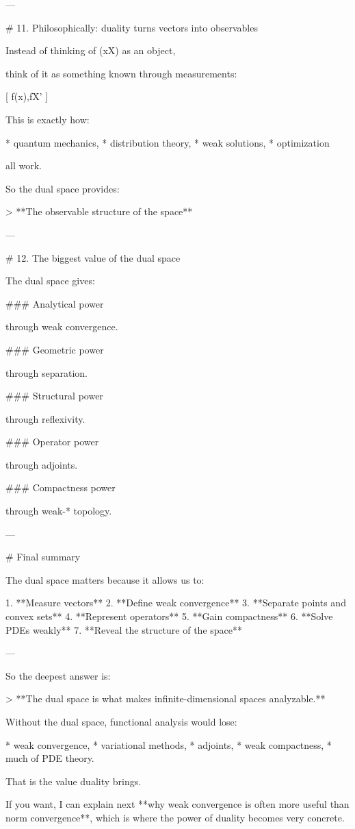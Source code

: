 \begin{description}
---

# 11. Philosophically: duality turns vectors into observables

Instead of thinking of (x\in X) as an object,

think of it as something known through measurements:

[
f(x),\quad f\in X'
]

This is exactly how:

* quantum mechanics,
* distribution theory,
* weak solutions,
* optimization

all work.

So the dual space provides:

> **The observable structure of the space**

---

# 12. The biggest value of the dual space

The dual space gives:

### Analytical power

through weak convergence.

### Geometric power

through separation.

### Structural power

through reflexivity.

### Operator power

through adjoints.

### Compactness power

through weak-* topology.

---

# Final summary

The dual space matters because it allows us to:

1. **Measure vectors**
2. **Define weak convergence**
3. **Separate points and convex sets**
4. **Represent operators**
5. **Gain compactness**
6. **Solve PDEs weakly**
7. **Reveal the structure of the space**

---

So the deepest answer is:

> **The dual space is what makes infinite-dimensional spaces analyzable.**

Without the dual space, functional analysis would lose:

* weak convergence,
* variational methods,
* adjoints,
* weak compactness,
* much of PDE theory.

That is the value duality brings.

\end{description}

If you want, I can explain next **why weak convergence is often more useful than norm convergence**, which is where the power of duality becomes very concrete.

